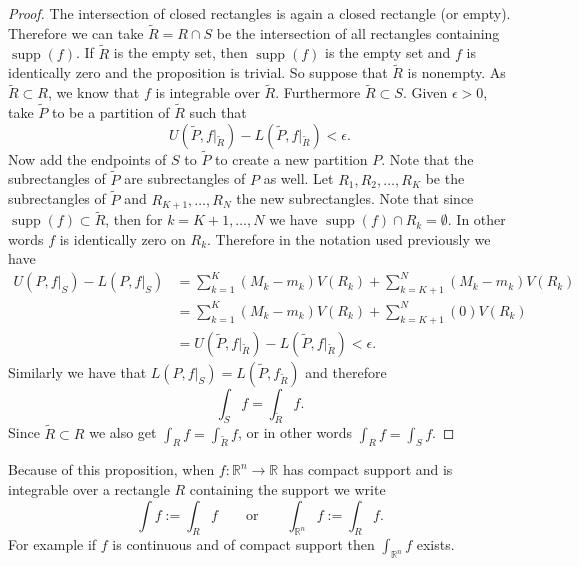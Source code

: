 \documentclass[12pt]{book}
\newcommand{\R}{{\mathbb{R}}}
\theoremstyle{plain}
\theoremstyle{remark}
\theoremstyle{definition}
\theoremstyle{exercise}
\theoremstyle{example}
\begin{document}
\begin{proof}
The intersection of closed rectangles is again a closed rectangle (or empty).  Therefore
we can take $\tilde{R} = R \cap S$ be the intersection of all rectangles containing
$\operatorname{supp}(f)$.  If $\tilde{R}$ is the empty set, then
$\operatorname{supp}(f)$ is the empty set and $f$ is identically zero
and the proposition is trivial.  So suppose that $\tilde{R}$ is nonempty.
As $\tilde{R} \subset R$, we know that $f$ is integrable over $\tilde{R}$.
Furthermore $\tilde{R} \subset S$.
Given $\epsilon > 0$, take $\tilde{P}$ to be a partition of $\tilde{R}$
such that
\begin{equation*}
U(\tilde{P},f|_{\tilde{R}})-
L(\tilde{P},f|_{\tilde{R}}) < \epsilon .
\end{equation*}
Now add the endpoints of $S$ to $\tilde{P}$ to create a new partition $P$.
Note that the subrectangles of $\tilde{P}$ are subrectangles of $P$ as well.
Let $R_1,R_2,\ldots,R_K$ be the subrectangles of $\tilde{P}$
and $R_{K+1},\ldots,R_N$ the new subrectangles.  Note that since
$\operatorname{supp}(f) \subset \tilde{R}$, then 
for $k=K+1,\ldots,N$ we have $\operatorname{supp}(f) \cap R_k = \emptyset$.
In other words $f$ is identically zero on $R_k$.  Therefore in the notation
used previously we have
\begin{equation*}
\begin{split}
U(P,f|_S)-L(P,f|_S) & =
\sum_{k=1}^K (M_k-m_k) V(R_k)
+
\sum_{k=K+1}^N (M_k-m_k) V(R_k)
\\
& =
\sum_{k=1}^K (M_k-m_k) V(R_k)
+
\sum_{k=K+1}^N (0) V(R_k)
\\
& =
U(\tilde{P},f|_{\tilde{R}})-
L(\tilde{P},f|_{\tilde{R}}) < \epsilon .
\end{split}
\end{equation*}
Similarly we have that
$L(P,f|_S) = L(\tilde{P},f_{\tilde{R}})$
and therefore
\begin{equation*}
\int_S f = \int_{\tilde{R}} f.
\end{equation*}
Since $\tilde{R} \subset R$ we also get $\int_R f = \int_{\tilde{R}} f$,
or in other words $\int_R f = \int_S f$.
\end{proof}


Because of this proposition, when $f \colon \R^n \to \R$ has compact support
and is integrable over a rectangle $R$ containing the support we write
\begin{equation*}
\int f := \int_R f \qquad \text{or} \qquad 
\int_{\R^n} f := \int_R f .
\end{equation*}
For example if $f$ is continuous and of compact support then
$\int_{\R^n} f$ exists.
\end{document}
